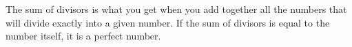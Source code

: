 The sum of divisors is what you get when you add together all the
 numbers that will divide exactly into a given number. If the 
sum of divisors is equal to the number itself, it is a perfect number.